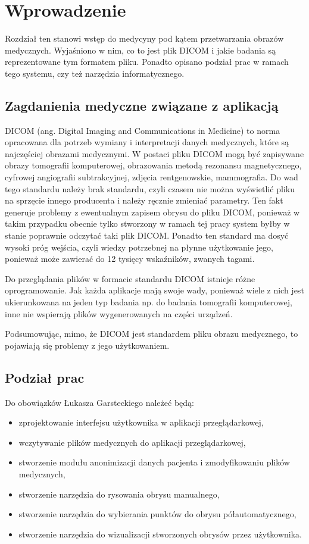 \documentclass[a4paper,11pt,twoside,openright]{report}
\theoremstyle{definition}
\begin{document}
\chapter {Wprowadzenie}

Rozdział ten stanowi wstęp do medycyny pod kątem przetwarzania obrazów medycznych. Wyjaśniono w nim, co to jest plik DICOM i jakie badania są reprezentowane tym formatem pliku. Ponadto opisano podział prac w ramach tego systemu, czy też narzędzia informatycznego.

\section {Zagdanienia medyczne związane z aplikacją}

DICOM (ang. Digital Imaging and Communications in Medicine) \cite{DICOM} to norma opracowana dla potrzeb wymiany i interpretacji danych medycznych, które są najczęściej obrazami medycznymi. W postaci pliku DICOM mogą być zapisywane obrazy tomografii komputerowej, obrazowania metodą rezonansu magnetycznego, cyfrowej angiografii subtrakcyjnej, zdjęcia rentgenowskie, mammografia. Do wad tego standardu należy brak standardu, czyli czasem nie można wyświetlić pliku na sprzęcie innego producenta i należy ręcznie zmieniać parametry. Ten fakt generuje problemy z ewentualnym zapisem obrysu do pliku DICOM, ponieważ w takim przypadku obecnie tylko stworzony w ramach tej pracy system byłby w stanie poprawnie odczytać taki plik DICOM. Ponadto ten standard ma dosyć wysoki próg wejścia, czyli wiedzy potrzebnej na płynne użytkowanie jego, ponieważ może zawierać do 12 tysięcy wskaźników, zwanych tagami.

Do przeglądania plików w formacie standardu DICOM istnieje różne oprogramowanie. Jak każda aplikacje mają swoje wady, ponieważ wiele z nich jest ukierunkowana na jeden typ badania np. do badania tomografii komputerowej, inne nie wspierają plików wygenerowanych na części urządzeń.

Podsumowując, mimo, że DICOM jest standardem pliku obrazu medycznego, to pojawiają się problemy z jego użytkowaniem.

\section {Podział prac}

Do obowiązków Łukasza Garsteckiego należeć będą:

\begin{itemize}[noitemsep]
\item zprojektowanie interfejsu użytkownika w aplikacji przeglądarkowej,
\item wczytywanie plików medycznych do aplikacji przeglądarkowej,
\item stworzenie modułu anonimizacji danych pacjenta i zmodyfikowaniu plików medycznych,
\item stworzenie narzędzia do rysowania obrysu manualnego,
\item stworzenie narzędzia do wybierania punktów do obrysu półautomatycznego,
\item stworzenie narzędzia do wizualizacji stworzonych obrysów przez użytkownika.
\end{itemize}
\end{document}
